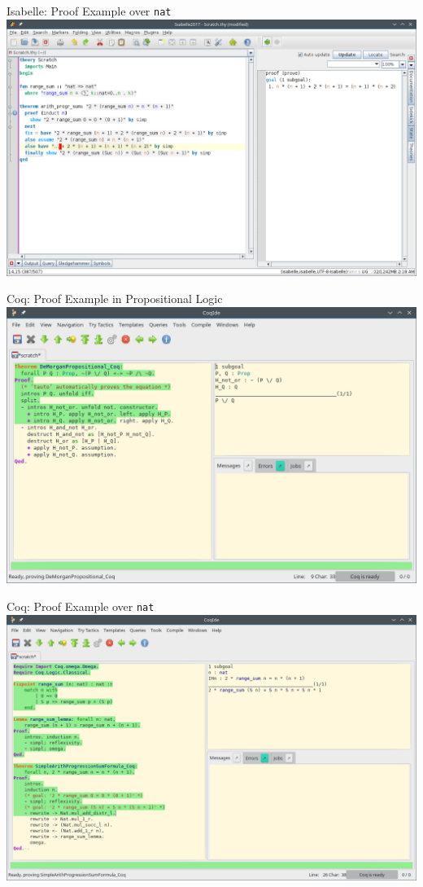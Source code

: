\documentclass[aspectratio=169, fleqn]{beamer}
\begin{document}
\begin{frame}{Isabelle: Proof Example over \texttt{nat}}
\includegraphics[scale=0.39]{img/isabelle_arith.png}
\end{frame}



\begin{frame}{Coq: Proof Example in Propositional Logic}
\includegraphics[scale=0.4]{img/coq_morgan.png}
\end{frame}

\begin{frame}{Coq: Proof Example over \texttt{nat}}
\includegraphics[scale=0.39]{img/gif-coq/coq-arith-6.png}
\end{frame}
\end{document}
